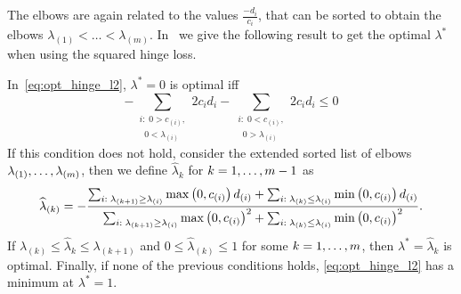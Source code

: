 The elbows are again related to the values $\frac{-d_i}{c_i}$, that can be sorted to obtain the elbows ${\lambda}_{(1)} < \ldots < {\lambda}_{(m)}$.
In~\citet[Proposition 2]{RuizAD21} we give the following result to get the optimal $\lambda^*$ when using the squared hinge loss.
\begin{prop}\label{prop:sqhinge_neurocom2020}
    In~\eqref{eq:opt_hinge_l2},
    $\lambda^*=0$ is optimal iff 
    \begin{equation}\nonumber
        -\sum_{\substack{i:\; 0 > c_{(i)},\\ \;\; 0 < \lambda_{(i)}}} {2 c_i d_i} - \sum_{\substack{i:\; 0 < c_{(i)},\\ \;\; 0 > \lambda_{(i)}}} {2 c_i d_i}  \leq 0
       \end{equation}
    If this condition does not hold, 
    consider the extended sorted list of elbows $\lambda_{(1)}, \ldots, \lambda_{(m)}$, then we define $\widehat{\lambda}_k$ for $k=1, \ldots,  m-1$ as %
\begin{equation}\label{eq:sol_hinge_2}
    \widehat{\lambda}_{(k)} = - \frac{\sum_{i:\; \lambda_{(k+1)} \geq \lambda_{(i)}} \mymax{0, c_{(i)}} d_{(i)} + \sum_{i:\; \lambda_{(k)} \leq \lambda_{(i)}} \mymin{0, c_{(i)}} d_{(i)}}{\sum_{i:\; \lambda_{(k+1)} \geq \lambda_{(i)}} \mymax{0, c_{(i)}}^2 + \sum_{i:\; \lambda_{(k)} \leq \lambda_{(i)}} \mymin{0, c_{(i)}}^2} .
\end{equation}
%
If $\lambda_{(k)} \leq \widehat{\lambda}_k \leq  \lambda_{(k+1)}$ and $0 \leq \widehat{\lambda}_{(k)} \leq 1$ for some $k=1, \ldots, m$, then $\lambda^* = \widehat{\lambda}_k$ is optimal.
Finally, if none of the previous conditions holds, \eqref{eq:opt_hinge_l2} has a minimum at $\lambda^* = 1$.
\end{prop}
